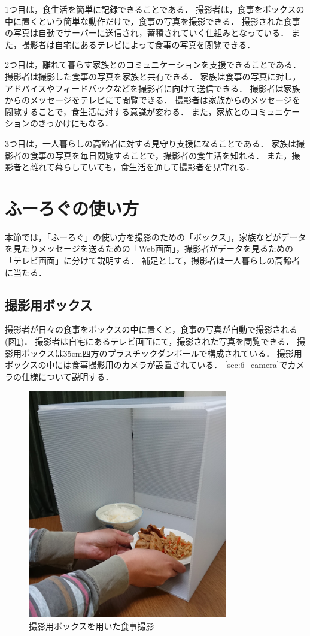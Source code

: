 \documentclass[../report]{subfiles}
\begin{document}
1つ目は，食生活を簡単に記録できることである．
撮影者は，食事をボックスの中に置くという簡単な動作だけで，食事の写真を撮影できる．
撮影された食事の写真は自動でサーバーに送信され，蓄積されていく仕組みとなっている．
また，撮影者は自宅にあるテレビによって食事の写真を閲覧できる．

2つ目は，離れて暮らす家族とのコミュニケーションを支援できることである．
撮影者は撮影した食事の写真を家族と共有できる．
家族は食事の写真に対し，アドバイスやフィードバックなどを撮影者に向けて送信できる．
撮影者は家族からのメッセージをテレビにて閲覧できる．
撮影者は家族からのメッセージを閲覧することで，食生活に対する意識が変わる．
また，家族とのコミュニケーションのきっかけにもなる．

3つ目は，一人暮らしの高齢者に対する見守り支援になることである．
家族は撮影者の食事の写真を毎日閲覧することで，撮影者の食生活を知れる．
また，撮影者と離れて暮らしていても，食生活を通して撮影者を見守れる．


\section{ふーろぐの使い方}
本節では，「ふーろぐ」の使い方を撮影のための「ボックス」，家族などがデータを見たりメッセージを送るための「Web画面」，撮影者がデータを見るための「テレビ画面」に分けて説明する．
補足として，撮影者は一人暮らしの高齢者に当たる．

\subsection{撮影用ボックス}
撮影者が日々の食事をボックスの中に置くと，食事の写真が自動で撮影される(図\ref{fig:5_fl})．
撮影者は自宅にあるテレビ画面にて，撮影された写真を閲覧できる．
撮影用ボックスは35cm四方のプラスチックダンボールで構成されている．
撮影用ボックスの中には食事撮影用のカメラが設置されている．
\ref{sec:6_camera}でカメラの仕様について説明する．

\begin{figure}[htbp]
    \begin{center}
        \includegraphics[height=10cm]{imgs/5_fl.png}
        \caption{撮影用ボックスを用いた食事撮影}
        \label{fig:5_fl}
    \end{center}
\end{figure}
\end{document}
